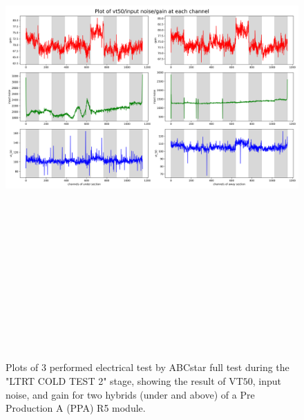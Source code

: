 \begin{figure}
    \centering
    \includegraphics[width=25cm,height=20cm,keepaspectratio]{Figures/results/LTRT_2_plot.png}
    \caption{Plots of $3$ performed electrical test by ABCstar full test during the "LTRT COLD TEST 2" stage, showing the result of VT$50$, input noise, and gain for two hybrids (under and above) of a Pre Production A (PPA) R5 module.}
    \label{fig:LTRT_result_2_large}
\end{figure}

